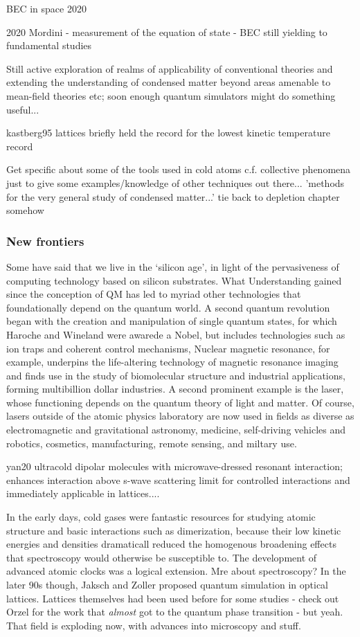 	

	BEC in space 2020

	2020 Mordini - measurement of the equation of state - BEC still yielding to fundamental studies

	Still active exploration of realms of applicability of conventional theories and extending the understanding of condensed matter beyond areas amenable to mean-field theories etc; soon enough quantum simulators might do something useful... 

	kastberg95
	lattices briefly held the record for the lowest kinetic temperature record

	Get specific about some of the tools used in cold atoms c.f. collective phenomena just to give some examples/knowledge of other techniques out there... 'methods for the very general study of condensed matter...' tie back to depletion chapter somehow

	\subsubsection{New frontiers}

	Some have said that we live in the `silicon age', in light of the
	pervasiveness of computing technology based on silicon substrates.
	What	Understanding	gained since the conception of QM has led to myriad other technologies	that foundationally depend on the quantum world.
	A second quantum	revolution began with the creation and manipulation of single quantum	states, for which Haroche and Wineland were awarede a Nobel, but	includes technologies such as ion traps and coherent control mechanisms,
	Nuclear magnetic	resonance, for example, underpins the life-altering technology of	magnetic resonance imaging and finds use in the study of biomolecular	structure and industrial applications, forming multibillion dollar	industries.
	A second prominent example is the laser, whose functioning
	depends on the quantum theory of light and matter.
	Of course, lasers outside of	the atomic physics laboratory are now used in fields as diverse	as electromagnetic and gravitational astronomy, medicine, self-driving	vehicles and robotics, cosmetics, manufacturing, remote sensing, and	miltary use.

	yan20 ultracold dipolar molecules with microwave-dressed resonant interaction; enhances interaction above s-wave scattering limit for controlled interactions and immediately applicable in lattices....

	In the early days, cold gases were
	fantastic resources for studying atomic structure and basic interactions
	such as dimerization, because their low kinetic energies and densities
	dramaticall reduced the homogenous broadening effects that spectroscopy
	would otherwise be susceptible to.
	The development of advanced atomic
	clocks was a logical extension.
	Mre about spectroscopy?
	In the later 90s though, Jaksch and
	Zoller proposed quantum simulation in optical lattices.
	Lattices
	themselves had been used before for some studies - check out Orzel for
	the work that \emph{almost} got to the quantum phase transition - but
	yeah.
	That field is exploding now, with advances into microscopy and
	stuff.

